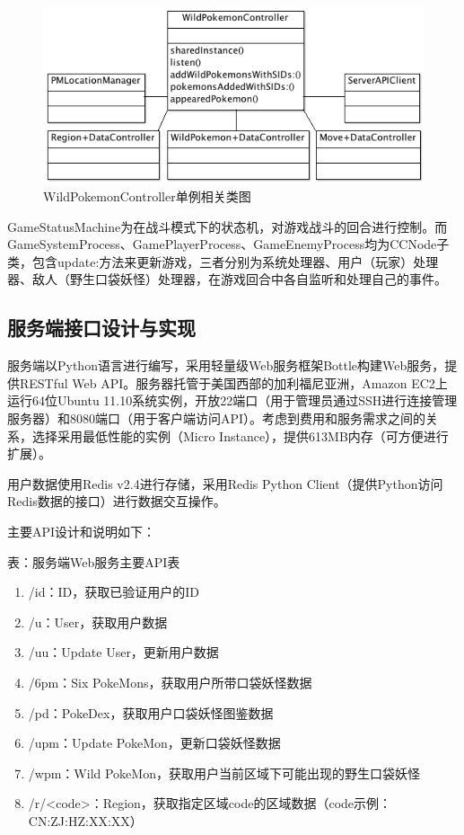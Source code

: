 \documentclass{article}
\begin{document}
\begin{CJK}{UTF8}{gbsn}
  \begin{figure}[htbp]
		\centering
		\includegraphics[bb=0 0 533 247, scale=0.45]{figure/fig_n18.png}
		\caption{WildPokemonController单例相关类图}
		\label{fig:n18}
	\end{figure}

  GameStatusMachine为在战斗模式下的状态机，对游戏战斗的回合进行控制。而GameSystemProcess、GamePlayerProcess、GameEnemyProcess均为CCNode子类，包含update:方法来更新游戏，三者分别为系统处理器、用户（玩家）处理器、敌人（野生口袋妖怪）处理器，在游戏回合中各自监听和处理自己的事件。

  \subsection{服务端接口设计与实现}
  服务端以Python语言进行编写，采用轻量级Web服务框架Bottle构建Web服务，提供RESTful Web API。服务器托管于美国西部的加利福尼亚洲，Amazon EC2上运行64位Ubuntu 11.10系统实例，开放22端口（用于管理员通过SSH进行连接管理服务器）和8080端口（用于客户端访问API）。考虑到费用和服务需求之间的关系，选择采用最低性能的实例（Micro Instance），提供613MB内存（可方便进行扩展）。

  用户数据使用Redis v2.4进行存储，采用Redis Python Client（提供Python访问Redis数据的接口）进行数据交互操作。

  主要API设计和说明如下：

  表：服务端Web服务主要API表
  \begin{enumerate}
		\item /id：ID，获取已验证用户的ID
		\item /u：User，获取用户数据
		\item /uu：Update User，更新用户数据
		\item /6pm：Six PokeMons，获取用户所带口袋妖怪数据
		\item /pd：PokeDex，获取用户口袋妖怪图鉴数据
		\item /upm：Update PokeMon，更新口袋妖怪数据
		\item /wpm：Wild PokeMon，获取用户当前区域下可能出现的野生口袋妖怪
		\item /r/<code>：Region，获取指定区域code的区域数据（code示例：CN:ZJ:HZ:XX:XX）
  \end{enumerate}


\end{CJK}
\end{document}
